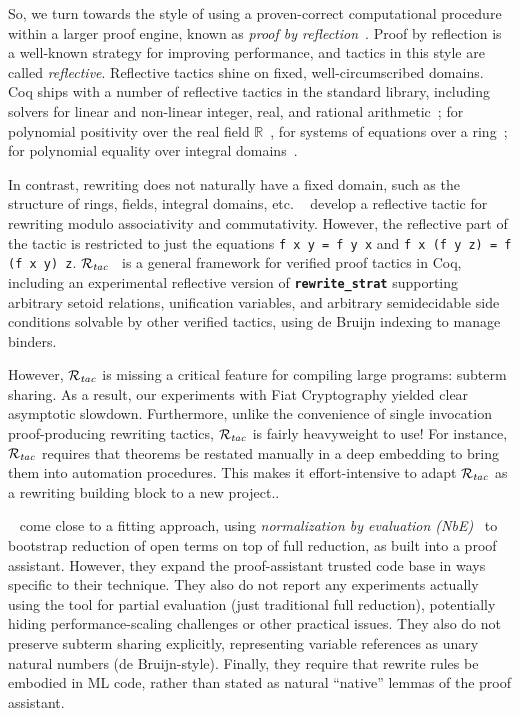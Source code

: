 \documentclass[sn-mathphys,pdflatex]{sn-jnl}%
\newcommand{\citetfield}[1]{\usebibentry{#1}{citet}~\cite{#1}}
\newcommand{\Rtac}{\ensuremath{\mathcal{R}_\text{\emph{tac}}}}
\newcommand{\tacrewritestrat}{\textbf{\texttt{rewrite\_strat}}}
\theoremstyle{thmstyleone}%
\theoremstyle{thmstyletwo}%
\theoremstyle{thmstylethree}%
\begin{document}
So, we turn towards the style of using a proven-correct computational procedure within a larger proof engine, known as \emph{proof by reflection}~\cite{ReflectionTACS97}.
Proof by reflection is a well-known strategy for improving performance, and tactics in this style are called \emph{reflective}.
Reflective tactics shine on fixed, well-circumscribed domains.
Coq ships with a number of reflective tactics in the standard library, including solvers for linear and non-linear integer, real, and rational arithmetic~\cite{micromega,romega}; for polynomial positivity over the real field $\mathbb{R}$~\cite{psatz}, for systems of equations over a ring~\cite{ReflectionTACS97}; for polynomial equality over integral domains~\cite{nsatz,gbcoq}.

In contrast, rewriting does not naturally have a fixed domain, such as the structure of rings, fields, integral domains, etc.
\citetfield{aacrewrite} develop a reflective tactic for rewriting modulo associativity and commutativity.
However, the reflective part of the tactic is restricted to just the equations \texttt{f x y = f y x} and \texttt{f x (f y z) = f (f x y) z}.
  \Rtac{}~\cite{rtac} is a general framework for verified proof tactics in Coq, including an experimental reflective version of \tacrewritestrat{} supporting arbitrary setoid relations, unification variables, and arbitrary semidecidable side conditions solvable by other verified tactics, using de Bruijn indexing to manage binders.

However, \Rtac{} is missing a critical feature for compiling large programs: subterm sharing.
As a result, our experiments with Fiat Cryptography yielded clear asymptotic slowdown.
Furthermore, unlike the convenience of single invocation proof-producing rewriting tactics, \Rtac{} is fairly heavyweight to use!
For instance, \Rtac{} requires that theorems be restated manually in a deep embedding to bring them into automation procedures.
This makes it effort-intensive to adapt \Rtac{} as a rewriting building block to a new project..

\citetfield{Aehlig} come close to a fitting approach, using \emph{normalization by evaluation (NbE)}~\cite{NbE} to bootstrap reduction of open terms on top of full reduction, as built into a proof assistant.\label{sec:aehlig-intro}
However, they expand the proof-assistant trusted code base in ways specific to their technique.
They also do not report any experiments actually using the tool for partial evaluation (just traditional full reduction), potentially hiding performance-scaling challenges or other practical issues.
They also do not preserve subterm sharing explicitly, representing variable references as unary natural numbers (de Bruijn-style).
Finally, they require that rewrite rules be embodied in ML code, rather than stated as natural ``native'' lemmas of the proof assistant.
\end{document}
